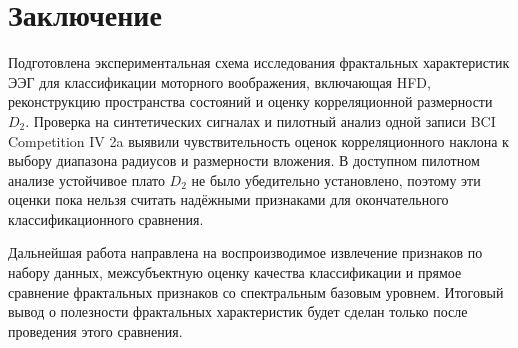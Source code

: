 \section{Заключение}

Подготовлена экспериментальная схема исследования фрактальных характеристик ЭЭГ для классификации моторного воображения, включающая HFD, реконструкцию пространства состояний и оценку корреляционной размерности $D_2$. Проверка на синтетических сигналах и пилотный анализ одной записи BCI Competition IV 2a выявили чувствительность оценок корреляционного наклона к выбору диапазона радиусов и размерности вложения. В доступном пилотном анализе устойчивое плато $D_2$ не было убедительно установлено, поэтому эти оценки пока нельзя считать надёжными признаками для окончательного классификационного сравнения.

Дальнейшая работа направлена на воспроизводимое извлечение признаков по набору данных, межсубъектную оценку качества классификации и прямое сравнение фрактальных признаков со спектральным базовым уровнем. Итоговый вывод о полезности фрактальных характеристик будет сделан только после проведения этого сравнения.
